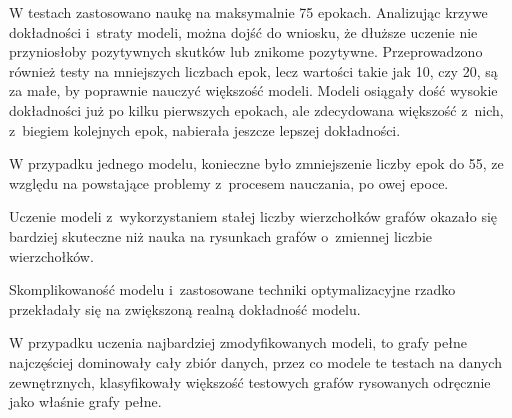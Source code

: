 W testach zastosowano naukę na maksymalnie 75 epokach.
Analizując krzywe dokładności i~straty modeli, można dojść do wniosku,
że dłuższe uczenie nie przyniosłoby pozytywnych skutków lub znikome pozytywne.
Przeprowadzono również testy na mniejszych liczbach epok, lecz wartości takie jak 10, czy 20,
są za małe, by poprawnie nauczyć większość modeli.
Modeli osiągały dość wysokie dokładności już po kilku pierwszych epokach,
ale zdecydowana większość z~nich, z~biegiem kolejnych epok, nabierała jeszcze lepszej dokładności.

W przypadku jednego modelu, konieczne było zmniejszenie liczby epok do 55,
ze względu na powstające problemy z~procesem nauczania, po owej epoce.

Uczenie modeli z~wykorzystaniem stałej liczby wierzchołków grafów okazało się bardziej skuteczne
niż nauka na rysunkach grafów o~zmiennej liczbie wierzchołków.

Skomplikowaność modelu i~zastosowane techniki optymalizacyjne rzadko przekładały się na zwiększoną realną dokładność modelu.

W przypadku uczenia najbardziej zmodyfikowanych modeli, to grafy pełne najczęściej dominowały cały zbiór danych,
przez co modele te testach na danych zewnętrznych,
klasyfikowały większość testowych grafów rysowanych odręcznie jako właśnie grafy pełne.